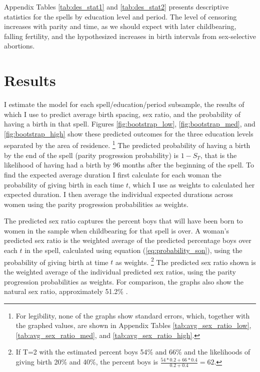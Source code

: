 \documentclass[12pt,letterpaper]{article}
\begin{document}
Appendix Tables \ref{tab:des_stat1} and \ref{tab:des_stat2} presents descriptive 
statistics for the spells by education level and period.
The level of censoring increases with parity and time, as we should expect with later 
childbearing, falling fertility, and the hypothesized increases in birth intervals from 
sex-selective abortions.



\section{Results\label{sec:results}}


I estimate the model for each spell/education/period subsample, the results of which I use 
to predict average birth spacing, sex ratio, and the probability of having a birth in that 
spell.
Figures \ref{fig:bootstrap_low}, \ref{fig:bootstrap_med}, and  \ref{fig:bootstrap_high} 
show these predicted outcomes for the three education levels separated by the area of 
residence.%
\footnote{
For legibility, none of the graphs show standard errors, which, together with the graphed 
values, are shown in Appendix Tables 
\ref{tab:avg_sex_ratio_low}, 
\ref{tab:avg_sex_ratio_med}, and 
\ref{tab:avg_sex_ratio_high}.
}
The predicted probability of having a birth by the end of the spell (parity progression
probability) is $1-S_{T}$, that is the likelihood of having had a birth by 96 months after 
the beginning of the spell.
To find the expected average duration I first calculate for each woman the probability 
of giving birth in each time $t$, which I use as weights to calculated her expected duration. 
I then average the individual expected durations across women using the parity progression
probabilities as weights.

The predicted sex ratio captures the percent boys that will have been born to women 
in the sample when childbearing for that spell is over.
A woman's predicted sex ratio is the weighted average of the predicted percentage boys 
over each $t$ in the spell, calculated using equation (\ref{eq:probability_son}), using
the probability of giving birth at time $t$ as weights.%
\footnote{
If T=2 with the estimated percent boys 54\% and 66\% and the likelihoods of giving 
birth 20\% and 40\%, the percent boys is $\frac{54*0.2+66*0.4}{0.2+0.4} = 62$.
}
The predicted sex ratio shown is the weighted average of the individual predicted sex 
ratios, using the parity progression probabilities as weights.
For comparison, the graphs also show the natural sex ratio, approximately 51.2\% 
\citep{ben-porath76b,jacobsen99,Portner2015b}.
\end{document}
